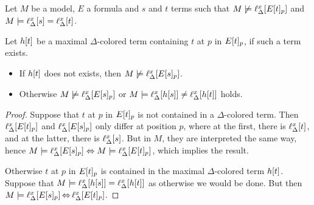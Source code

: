 



\begin{lemma}
	\label{aga5tg5ba}
	Let $M$ be a model, $E$ a formula and $s$ and $t$ terms such that
	$M\not\models \ell_{\Delta}^{x}[E{[t]_{p}}]$ 
	and
	$M \models \ell_{\Delta}^{x}[s] = \ell_{\Delta}^{x}[t]$.

	Let $h[t]$ be a maximal $\Delta$-colored term containing $t$ at $p$ in $E{[t]_{p}}$, if such a term exists.
\begin{itemize}
\item If $h[t]$ does not exists, then
		$M\not\models \ell_{\Delta}^{x}[E{[s]_{p}}]$.
\item Otherwise
		$M\not\models \ell_{\Delta}^{x}[E{[s]_{p}}]$
	or $M\models \ell_{\Delta}^{x}[h[s]] \neq \ell_{\Delta}^{x}[h[t]]$ holds.
\end{itemize}
\end{lemma}
\begin{proof} 
	Suppose that $t$ at $p$ in $E{[t]_{p}}$ is not contained in a $\Delta$-colored term.
	Then $\ell_{\Delta}^{x}[E{[t]_{p}}]$ and $\ell_{\Delta}^{x}[E{[s]_{p}}]$ only differ at position $p$, where at the first, there is $\ell_{\Delta}^{x}[t]$, and at the latter, there is $\ell_{\Delta}^{x}[s]$. But in $M$, they are interpreted the same way, hence $M\models \ell_{\Delta}^{x}[E{[s]_{p}}] \;{\operatorname{\Leftrightarrow}}\; M \models \ell_{\Delta}^{x}[E{[t]_{p}}]$, which implies the result.

	Otherwise $t$ at $p$ in $E{[t]_{p}}$ is contained in the maximal $\Delta$-colored term $h[t]$.
	Suppose that $M\models \ell_{\Delta}^{x}[h[s]]  = \ell_{\Delta}^{x}[h[t]]$ as otherwise we would be done.
	But then $M \models \ell_{\Delta}^{x}[E{[s]_{p}}] \operatorname{\Leftrightarrow}{} \ell_{\Delta}^{x}[E{[t]_{p}}]$.
\end{proof} 



